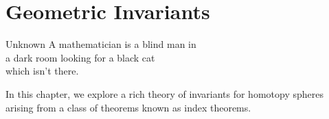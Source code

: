 \chapter{Geometric Invariants}\label{chap:invariants}

\begin{epigraph}{15em}{Unknown}
	A mathematician is a blind man in \\
	a dark room looking for a black cat \\
	which isn’t there.
\end{epigraph}

In this chapter, we explore a rich theory of invariants for homotopy spheres arising from a class of theorems known as index theorems. 



